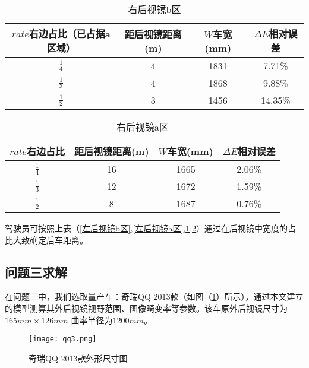 \documentclass[withoutpreface,bwprint]{cumcmthesis} %
\begin{document}
\begin{table}[!htbp]
\centering
\caption{右后视镜b区}
\label{右后视镜b区}
\begin{tabular}{cccc}
\toprule
$rate$右边占比（已占据a区域）& 距后视镜距离(m) & $W$车宽(mm) & $\Delta E$相对误差  \\ \midrule
$\frac{1}{4}$ & 4 & 1831 & 7.71\% \\
$\frac{1}{3}$ & 4 & 1868 & 9.88\% \\
$\frac{1}{2}$ & 3 & 1456 & 14.35\% \\
\bottomrule 
\end{tabular}
\end{table}

\begin{table}[!htbp]
\centering
\caption{右后视镜a区}
\label{右后视镜a区}
\begin{tabular}{cccc}
\toprule
$rate$右边占比 & 距后视镜距离(m) & $W$车宽(mm) & $\Delta E$相对误差  \\ \midrule
$\frac{1}{4}$ & 16 & 1665 & 2.06\% \\
$\frac{1}{3}$ & 12 & 1672 & 1.59\% \\
$\frac{1}{2}$ & 8 & 1687 & 0.76\% \\
\bottomrule 
\end{tabular}
\end{table}

\par 驾驶员可按照上表（\ref{左后视镜b区},\ref{左后视镜a区},\ref{右后视镜b区},\ref{右后视镜a区}）通过在后视镜中宽度的占比大致确定后车距离。

\subsection{问题三求解}
\par 在问题三中，我们选取量产车：奇瑞QQ 2013款（如图（\ref{fig:qq3}）所示），通过本文建立的模型测算其外后视镜视野范围、图像畸变率等参数。该车原外后视镜尺寸为$165mm \times 126mm$ 曲率半径为$1200mm$。
\begin{figure}[h]
\small
\centering
\texttt{[image: qq3.png]}
\caption{奇瑞QQ 2013款外形尺寸图} \label{fig:qq3}
\end{figure}
\end{document}
